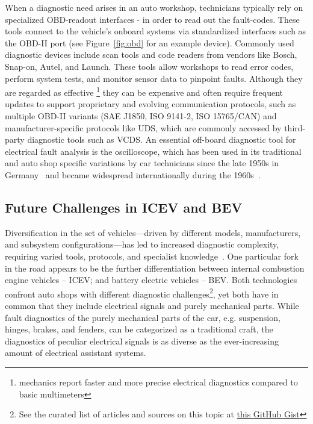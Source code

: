 \documentclass[conference,a4paper]{IEEEtran}
\begin{document}
When a diagnostic need arises in an auto workshop, technicians typically rely on specialized OBD-readout interfaces - in order to read out the fault-codes. 
These tools connect to the vehicle’s onboard systems via standardized interfaces such as the OBD-II port (see Figure~\ref{fig:obd} for an example device). 
Commonly used diagnostic devices include scan tools and code readers from vendors like Bosch, Snap-on, Autel, and Launch. 
These tools allow workshops to read error codes, perform system tests, and monitor sensor data to pinpoint faults. 
Although they are regarded as effective \footnote{mechanics report faster and more precise electrical diagnostics compared to basic 
multimeters\cite{redditscopeefficiency}} they can be expensive and often require frequent updates to support proprietary and evolving communication protocols, 
such as multiple OBD-II variants (SAE J1850, ISO 9141-2, ISO 15765/CAN) and manufacturer-specific protocols like UDS, which are commonly accessed by third-party 
diagnostic tools such as VCDS\cite{obd2protocols, obd2wiki, vcds}.
An essential off-board diagnostic tool for electrical fault analysis is the oscilloscope, 
which has been used in its traditional and auto shop specific variations by car technicians since the late 1950s in Germany~\cite{hameghistory} and became widespread internationally during the 1960s~\cite{autoscopehist}.

\subsection{Future Challenges in ICEV and BEV}
Diversification in the set of vehicles—driven by different models, manufacturers, and subsystem configurations—has led to increased diagnostic complexity, 
requiring varied tools, protocols, and specialist knowledge~\cite{autodiagnosticsdiversity, triddiagnosticcomplexity}. 
One particular fork in the road appears to be the further differentiation between internal combustion engine vehicles – ICEV; and battery electric vehicles – BEV. 
Both technologies confront auto shops with different diagnostic challenges\footnote{See the curated list of articles and sources on this topic at \href{https://gist.github.com/kathamatician/fbc405fd53297b142fcf41163fad2d1e}{this GitHub Gist}},  
yet both have in common that they include electrical signals and purely mechanical parts. 
While fault diagnostics of the purely mechanical parts of the car, e.g. suspension, hinges, brakes, and fenders, can be categorized as a traditional craft, 
the diagnostics of peculiar electrical signals is as diverse as the ever-increasing amount of electrical assistant systems. 
\end{document}
